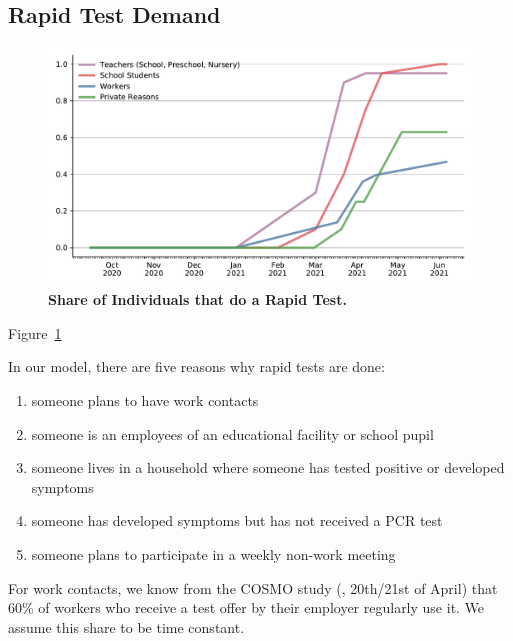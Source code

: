 \FloatBarrier

\subsection{Rapid Test Demand}


\begin{figure}
    \centering
    \includegraphics[width=\textwidth]{../figures/results/figures/data/testing/rapid_test_demand_shares}
    \caption{\textbf{Share of Individuals that do a Rapid Test.}}
    \label{fig:rapid_test_demand}
\end{figure}

Figure~\ref{fig:rapid_test_demand}


In our model, there are five reasons why rapid tests are done:
\begin{enumerate}
    \item someone plans to have work contacts
    \item someone is an employees of an educational facility or school pupil
    \item someone lives in a household where someone has tested positive or developed
          symptoms
    \item someone has developed symptoms but has not received a PCR test
    \item someone plans to participate in a weekly non-work meeting
\end{enumerate}


For work contacts, we know from the COSMO study (\cite{Betsch2021}, 20th/21st of April)
that 60\% of workers who receive a test offer by their employer regularly use it. We
assume this share to be time constant.

